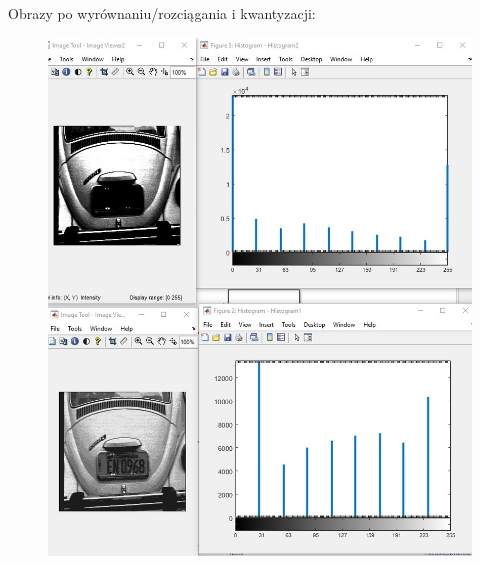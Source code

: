\documentclass{article}
\begin{document}
\newpage

Obrazy po wyrównaniu/rozciągania i kwantyzacji:


\begin{figure}[h!]
    \centering
    \includegraphics[scale=0.5]{zad2_b.jpg}
\end{figure}
\end{document}
